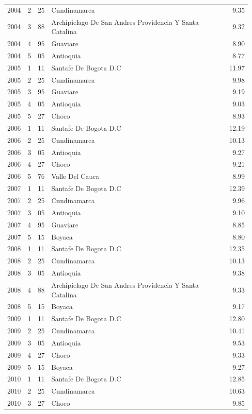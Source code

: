 \begin{tabular}{rrllr}
2004 & 2 & 25 & Cundinamarca & 9.35 \\
2004 & 3 & 88 & Archipielago De San Andres Providencia Y Santa Catalina & 9.32 \\
2004 & 4 & 95 & Guaviare & 8.90 \\
2004 & 5 & 05 & Antioquia & 8.77 \\
2005 & 1 & 11 & Santafe De Bogota D.C & 11.97 \\
2005 & 2 & 25 & Cundinamarca & 9.98 \\
2005 & 3 & 95 & Guaviare & 9.19 \\
2005 & 4 & 05 & Antioquia & 9.03 \\
2005 & 5 & 27 & Choco & 8.93 \\
2006 & 1 & 11 & Santafe De Bogota D.C & 12.19 \\
2006 & 2 & 25 & Cundinamarca & 10.13 \\
2006 & 3 & 05 & Antioquia & 9.27 \\
2006 & 4 & 27 & Choco & 9.21 \\
2006 & 5 & 76 & Valle Del Cauca & 8.99 \\
2007 & 1 & 11 & Santafe De Bogota D.C & 12.39 \\
2007 & 2 & 25 & Cundinamarca & 9.96 \\
2007 & 3 & 05 & Antioquia & 9.10 \\
2007 & 4 & 95 & Guaviare & 8.85 \\
2007 & 5 & 15 & Boyaca & 8.80 \\
2008 & 1 & 11 & Santafe De Bogota D.C & 12.35 \\
2008 & 2 & 25 & Cundinamarca & 10.13 \\
2008 & 3 & 05 & Antioquia & 9.38 \\
2008 & 4 & 88 & Archipielago De San Andres Providencia Y Santa Catalina & 9.33 \\
2008 & 5 & 15 & Boyaca & 9.17 \\
2009 & 1 & 11 & Santafe De Bogota D.C & 12.80 \\
2009 & 2 & 25 & Cundinamarca & 10.41 \\
2009 & 3 & 05 & Antioquia & 9.53 \\
2009 & 4 & 27 & Choco & 9.33 \\
2009 & 5 & 15 & Boyaca & 9.27 \\
2010 & 1 & 11 & Santafe De Bogota D.C & 12.85 \\
2010 & 2 & 25 & Cundinamarca & 10.63 \\
2010 & 3 & 27 & Choco & 9.85 \\

\end{tabular}
